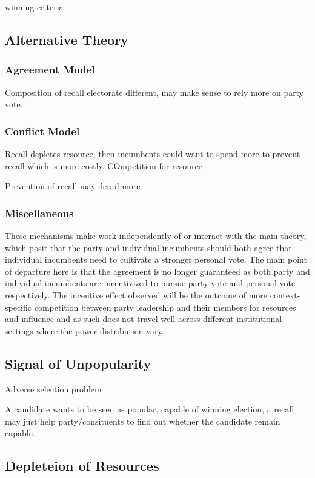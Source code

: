 \documentclass[hyphens, crop=false]{standalone}
\begin{document}
		winning criteria
		
		
	
	\subsection*{Alternative Theory}
	
		\subsubsection*{Agreement Model}
		Composition of recall electorate different,
		may make sense to rely more on party vote.
		
		
		\subsubsection*{Conflict Model}
		
		
		Recall depletes resource,
		then incumbents could want to spend more to
		prevent recall which is more costly.
		COmpetition for resource
		
		Prevention of recall may derail more
		
		
		
		\subsubsection*{Miscellaneous}
		These mechanisms make work independently of or interact with the main theory,
		which posit that the party and individual incumbents should both agree that
		individual incumbents need to cultivate a stronger personal vote.
		The main point of departure here is that
		the agreement is no longer guaranteed
		as both party and individual incumbents
		are incentivized to pursue party vote and personal vote respectively.
		The incentive effect observed will be the
		outcome of more context-specific competition between
		party leadership and their members for resources and influence
		and as such does not travel well across different institutional settings
		where the power distribution vary.
	
		\subsection*{Signal of Unpopularity}
		
		Adverse selection problem
		
		A candidate wants to be seen as popular, capable of winning election,
		a recall may just help party/consituents to find out whether
		the candidate remain capable.
		
	
		\subsection*{Depleteion of Resources}

	
		
	\newpage
	\printbibliography
	
	
\end{document}
